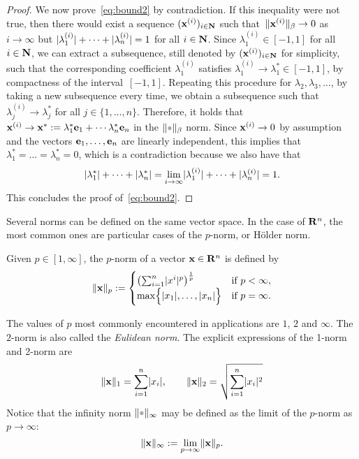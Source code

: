\begin{proof}
    We now prove~\eqref{eq:bound2} by contradiction.
    If this inequality were not true,
    then there would exist a sequence $(\mathbf x^{(i)})_{i \in \mathbf N}$ such
    that~$\lVert\mathbf x^{(i)}\rVert_{\beta} \to 0$ as $i \to \infty$ but $\lvert\lambda_1^{(i)}\rvert + \dotsb + \lvert\lambda_n^{(i)}\rvert = 1$ for all $i \in \mathbf N$.
    Since $\lambda_1^{(i)} \in [-1, 1]$ for all $i \in \mathbf N$,
    we can extract a subsequence, still denoted by $(\mathbf x^{(i)})_{i \in \mathbf N}$ for simplicity,
    such that the corresponding coefficient $\lambda_1^{(i)}$ satisfies $\lambda_1^{(i)} \to \lambda_1^* \in [-1, 1]$,
    by compactness of the interval~$[-1, 1]$.
    Repeating this procedure for $\lambda_2, \lambda_3, \dots$,
    by taking a new subsequence every time,
    we obtain a subsequence such that $\lambda^{(i)}_j \to \lambda_j^*$ for all $j \in \{1, \dotsc, n\}$.
    Therefore, it holds that $\mathbf x^{(i)} \to \mathbf x^* := \lambda_1^* \mathbf e_1 + \dotsb \lambda_n^* \mathbf e_n$ in the $\norm{\placeholder}_{\beta}$ norm.
    Since $\mathbf x^{(i)} \to 0$ by assumption and the vectors $\mathbf e_1, \dotsc, \mathbf e_n$ are linearly independent,
    this implies that $\lambda_1^* = \dots = \lambda_n^* = 0$,
    which is a contradiction because we also have that
    \[
        \lvert\lambda_1^*\rvert + \dotsb + \lvert\lambda_n^*\rvert = \lim_{i \to \infty} \lvert\lambda_1^{(i)}\rvert + \dotsb + \lvert\lambda_n^{(i)}\rvert = 1.
    \]
    This concludes the proof of~\eqref{eq:bound2}.
\end{proof}

Several norms can be defined on the same vector space.
In the case of $\mathbf R^n$,
the most common ones are particular cases of the $p$-norm, or H\"older norm.
\begin{definition}
    Given $p \in [1, \infty]$,
    the $p$-norm of a vector $\mathbf x \in \mathbf R^n$ is defined by
    \[
        \lVert\mathbf x\rVert_p :=
        \begin{cases}
            \left( \sum_{i=1}^{n} \lvert x^i\rvert^p \right)^{\frac{1}{p}} & \text{if $p < \infty$}, \\
            \max \Bigl\{ \lvert x_1\rvert, \dotsc, \lvert x_n\rvert \Bigr\} & \text{if $p = \infty$}.
        \end{cases}
    \]
\end{definition}
The values of $p$ most commonly encountered in applications are $1$, $2$ and $\infty$.
The $2$-norm is also called the \emph{Eulidean norm}.
The explicit expressions of the 1-norm and 2-norm are
\[
    \lVert\mathbf x\rVert_1 = \sum_{i=1}^{n} \lvert x_i\rvert,
    \qquad
    \lVert\mathbf x\rVert_2 = \sqrt{\sum_{i=1}^{n} \lvert x_i\rvert^2}
\]
Notice that the infinity norm $\norm{\placeholder}_{\infty}$ may be defined as the limit of the $p$-norm as $p \to \infty$:
\[
    \lVert\mathbf x\rVert_{\infty}
    := \lim_{p \to \infty} \lVert\mathbf x\rVert_p.
\]

